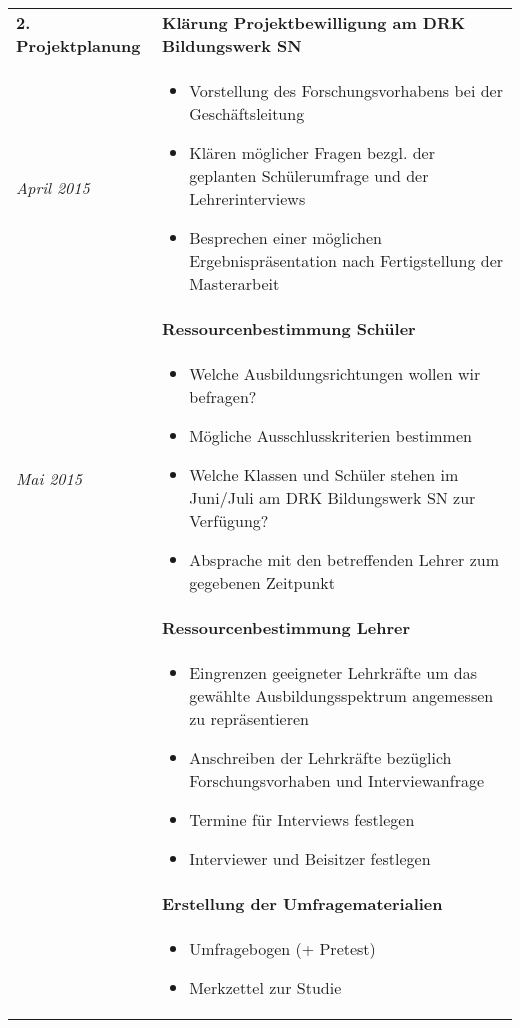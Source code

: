 \begin{longtable}{l|p{9.8cm}}
	\textbf{2. Projektplanung} & \textbf{Klärung Projektbewilligung am DRK Bildungswerk SN} \\
	\emph{April 2015} & 
	\vspace*{-0.6cm}
	\begin{itemize}[nosep,topsep=-0.6cm]
		\item Vorstellung des Forschungsvorhabens bei der Geschäftsleitung
		\item Klären möglicher Fragen bezgl. der geplanten Schülerumfrage und der Lehrerinterviews
		\item Besprechen einer möglichen Ergebnispräsentation nach Fertigstellung der Masterarbeit
	\end{itemize} \\ 
	& \textbf{Ressourcenbestimmung Schüler} \\*
	\emph{Mai 2015} & 
	\vspace*{-0.6cm}
	\begin{itemize}[nosep,topsep=-0.6cm]
		\item Welche Ausbildungsrichtungen wollen wir befragen?
		\item Mögliche Ausschlusskriterien bestimmen
		\item Welche Klassen und Schüler stehen im Juni/Juli am DRK Bildungswerk SN zur Verfügung?
		\item Absprache mit den betreffenden Lehrer zum gegebenen Zeitpunkt
	\end{itemize} \\
	& \textbf{Ressourcenbestimmung Lehrer} \\*
	&
	\vspace*{-0.6cm}
	\begin{itemize}[nosep,topsep=-0.6cm]
		\item Eingrenzen geeigneter Lehrkräfte um das gewählte Ausbildungsspektrum angemessen zu repräsentieren
		\item Anschreiben der Lehrkräfte bezüglich Forschungsvorhaben und Interviewanfrage
		\item Termine für Interviews festlegen
		\item Interviewer und Beisitzer festlegen
	\end{itemize} \\ 
	& \textbf{Erstellung der Umfragematerialien} \\*
	&
	\vspace*{-0.6cm}
	\begin{itemize}[nosep,topsep=-0.6cm]
		\item Umfragebogen (+ Pretest)
		\item Merkzettel zur Studie

\end{itemize}
\end{longtable}
